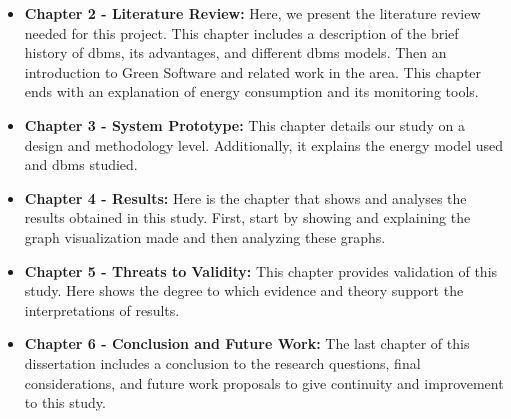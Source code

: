 \begin{itemize}
    \item \textbf{Chapter 2 - Literature Review:}  Here, we present the literature review needed for this project. This chapter includes a description of the brief history of \gls{dbms}, its advantages, and different \gls{dbms} models. Then an introduction to Green Software and related work in the area. This chapter ends with an explanation of energy consumption and its monitoring tools.

    \item \textbf{Chapter 3 - System Prototype:}  This chapter details our study on a design and methodology level. Additionally, it explains the energy model used and \gls{dbms} studied. 
    
    \item \textbf{Chapter 4 - Results:}  Here is the chapter that shows and analyses the results obtained in this study. First, start by showing and explaining the graph visualization made and then analyzing these graphs.
    
    \item \textbf{Chapter 5 - Threats to Validity:}  This chapter provides validation of this study. Here shows the degree to which evidence and theory support the interpretations of results.

    \item \textbf{Chapter 6 - Conclusion and Future Work:} The last chapter of this dissertation includes a conclusion to the research questions, final considerations, and future work proposals to give continuity and improvement to this study.
    
\end{itemize}



